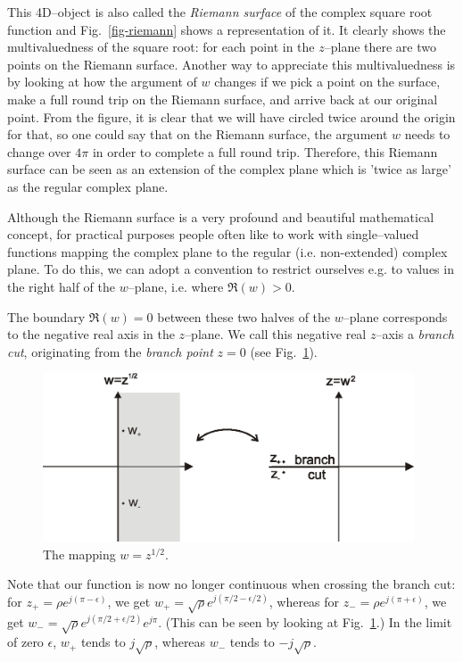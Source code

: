 This 4D--object is also called the \emph{Riemann surface} of the complex square
root function and Fig.~\ref{fig-riemann} shows a representation of it. It clearly shows the multivaluedness of the square root: for each
point in the $z$--plane there are two points on the Riemann surface. Another way
to appreciate this multivaluedness is by looking at how the argument of $w$
changes if we pick a point on the surface, make a full round trip on the Riemann
surface, and arrive back at our original point. From the figure, it is clear
that we will have circled twice around the origin for that, so one could say
that on the Riemann surface, the argument $w$ needs to change over $4 \pi$ in
order to complete a full round trip. Therefore, this Riemann surface can be seen
as an extension of the complex plane which is 'twice as large' as the regular
complex plane.

Although the Riemann surface is a very profound and beautiful mathematical
concept, for practical purposes people often like to work with single--valued
functions mapping the complex plane to the regular (i.e. non-extended) complex
plane. To do this, we can adopt a convention to restrict ourselves e.g. to
values in the right half of the $w$--plane, i.e. where $\Re(w)>0$.

The boundary $\Re(w)=0$ between these two halves of the $w$--plane corresponds
to the negative real axis in the $z$--plane. We call this negative real
$z$--axis a \emph{branch cut}, originating from the \emph{branch point} $z=0$
(see Fig.~\ref{fig-branchcut}).

\begin{figure}
\centering
\includegraphics[width=11cm]{complex/figures/branchcut}
\caption{The mapping $w=z^{1/2}$.}
\label{fig-branchcut}
\end{figure}

Note that our function is now no longer continuous when crossing the branch cut:
for $z_+ = \rho e^{j (\pi - \epsilon)}$, we get $w_+ = \sqrt{\rho} e^{j (\pi/2 -
\epsilon/2)}$, whereas for $z_- = \rho e^{j (\pi + \epsilon)}$, we get $w_- =
\sqrt{\rho} e^{j (\pi/2 + \epsilon/2)} e^{j \pi}$. (This can be seen by looking
at Fig.~\ref{fig-branchcut}.) In the limit of zero $\epsilon$, $w_+$ tends to
$j\sqrt{\rho}$, whereas $w_-$ tends to $-j\sqrt{\rho}$.

